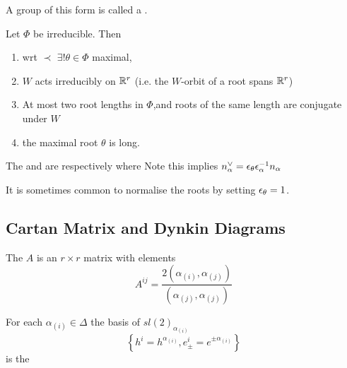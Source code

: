 \documentclass{article}
\begin{document}
\begin{remark}
	A group of this form is called a .
\end{remark}

\begin{prop}
	Let $\Phi$ be irreducible. Then
	\begin{enumerate}
		\item wrt $\prec$ $\exists! \theta \in \Phi$ maximal,
		\item $W$ acts irreducibly on $\mathbb{R}^r$ (i.e. the $W$-orbit of a root spans $\mathbb{R}^r$)
		\item At most two root lengths in $\Phi$,and roots of the same length are conjugate under $W$
		\item the maximal root $\theta$ is long. 
	\end{enumerate}
\end{prop}

\begin{definition}
	The  and  are respectively 
where 
Note this implies $n_\alpha^\vee = \epsilon_\theta \epsilon_\alpha^{-1} n_\alpha$
\end{definition}

\begin{remark}
	It is sometimes common to normalise the roots by setting $\epsilon_\theta = 1$. 
\end{remark}
\subsection{Cartan Matrix and Dynkin Diagrams}

\begin{definition}
	The  $A$ is an $r \times r$ matrix with elements 
	\[
	A^{ij}=\frac{2(\alpha_{(i)},\alpha_{(j)})}{(\alpha_{(j)},\alpha_{(j)})}
	\]
\end{definition}

\begin{definition}
	For each $\alpha_{(i)}\in\Delta$ the basis of $sl(2)_{\alpha_{(i)}}$
	\[
	\left\{ h^i=h^{\alpha_{(i)}}, e^i_\pm=e^{\pm\alpha_{(i)}} \right\}
	\]
	is the 
\end{definition}
\end{document}

